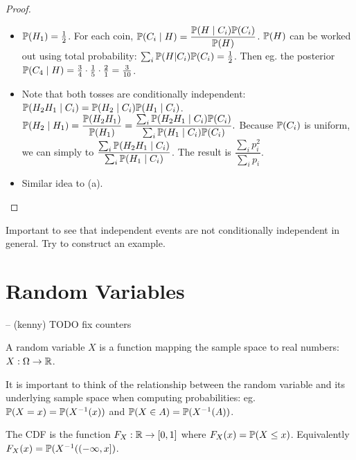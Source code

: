 \documentclass[10pt]{article}
\begin{document}
\begin{proof}
    \begin{itemize}
        \item{$\P(H_1) = \frac{1}{2}$. For each coin,
            $\P(C_i \mid H) = \dfrac{\P(H \mid C_i)\P(C_i)}{\P(H)}$. $\P(H)$
            can be worked out using total probability: $\sum_i \P(H |
        C_i)\P(C_i) = \frac{1}{2}$. Then eg. the posterior $\P(C_4\mid H) =
    \frac{3}{4}\cdot\frac{1}{5}\cdot\frac{2}{1} = \frac{3}{10}$.}
        \item{Note that both tosses are conditionally independent:
            $\P(H_2H_1\mid C_i) = \P(H_2\mid C_i)\P(H_1\mid C_i)$. $\P(H_2\mid
        H_1) = \dfrac{\P(H_2 H_1)}{\P(H_1)} = \dfrac{\sum_i \P(H_2 H_1 \mid C_i) \P(C_i)}{\sum_i \P(H_1 \mid C_i) \P(C_i)}.$ Because $\P(C_i)$ is
    uniform, we can simply to $\dfrac{\sum_i \P(H_2 H_1 \mid C_i)}{\sum_i \P(H_1 \mid C_i)}$. The result is $\dfrac{\sum_i p_i^2}{\sum_i p_i}$.}
    \item{Similar idea to (a).}
    \end{itemize}
\end{proof}

\begin{note}
    Important to see that independent events are not conditionally independent
    in general. Try to construct an example.
\end{note}


\section{Random Variables}
\renewcommand{\theexercise}{2.\arabic{exercise}}
\renewcommand{\thedefinition}{2.\arabic{definition}}
-- (kenny) TODO fix counters

\begin{definition}
    A random variable $X$ is a function mapping the sample space to real
    numbers: $X: \Omega \to \R$.
\end{definition}

It is important to think of the relationship between the random variable and
its underlying sample space when computing probabilities: eg. $\P(X = x) =
\P(X^{-1}(x))$ and $\P(X \in A) = \P(X^{-1}(A))$.

\begin{definition}
    The CDF is the function $F_X: \R \to [0, 1]$ where $F_X(x) = \P(X \leq x)$.
    Equivalently $F_X(x) = \P(X^{-1}((-\infty, x])$.
\end{definition}
\end{document}
